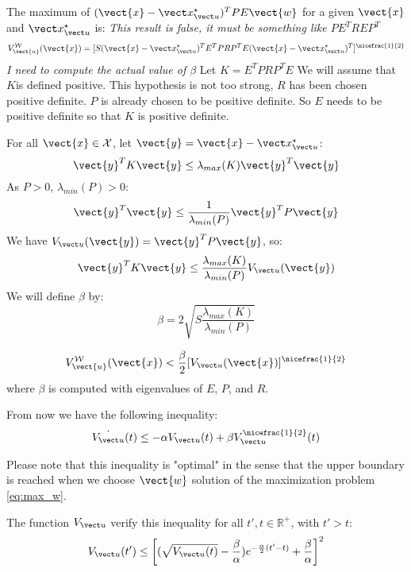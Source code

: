 The maximum of $(\vect{x} - \xu)^T P E \vect{w}$ for a given $\vect{x}$ and $\xu$ is:
\newcommand{\Vwu}{V_{\vect{u}}^{\mathcal{W}}}
\textit{This result is false, it must be something like $P E^T R E P^T $}
\begin{equation}
\Vwu(\vect{x}) = [S (\vect{x} -\xu)^T E^T P R P^T E (\vect{x} -\xu)^T ]^{\nicefrac{1}{2}}
\end{equation}
\textit{I need to compute the actual value of $\beta$}
Let $K = E^T P R P^T E$
We will assume that $K$is defined positive.
This hypothesis is not too strong, $R$ has been chosen positive definite.
$P$ is already chosen to be positive definite.
So $E$ needs to be positive definite so that $K$ is positive definite.

For all $\vect{x} \in \mathcal{X}$, let $\vect{y} = \vect{x} -\xu$:
$$\vect{y}^T K \vect{y} \leq  \lambda_{max}(K) \vect{y}^T \vect{y}$$
As $P>0$, $\lambda_{min}(P)>0$:
$$\vect{y}^T \vect{y} \leq \frac{1}{\lambda_{min}(P)}  \vect{y}^T P \vect{y}$$
We have $\Vu(\vect{y}) = \vect{y}^T P \vect{y}$, so:
$$\vect{y}^T K \vect{y} \leq \frac{\lambda_{max}(K)}{\lambda_{min}(P)}  \Vu(\vect{y})$$
\newcommand{\Bu}{\beta}
We will define $\Bu$ by:
$$\Bu = 2\sqrt{S \frac{\lambda_{max}(K)}{\lambda_{min}(P)} }$$

\begin{equation}
\Vwu(\vect{x}) < \frac{\Bu}{2} [\Vu(\vect{x})]^{\nicefrac{1}{2}}
\end{equation}
where $\Bu$ is computed with eigenvalues of $E$, $P$, and $R$.

From now we have the following inequality:
\begin{equation}
\dot{\Vu}(t) \leq -\alpha \Vu(t) + \Bu \Vu^{\nicefrac{1}{2}}(t)
\end{equation}

Please note that this inequality is "optimal" in the sense that the upper boundary is reached when  we choose $\vect{w}$ solution of the maximization problem \ref{eq:max_w}.

\begin{prop} \label{ineq:lyap}
The function $\Vu$ verify this inequality for all $t',t \in \mathbb{R}^+$, with $t'>t$:
\begin{equation}
\Vu(t') \leq  \left[ (\sqrt{\Vu(t)} - \frac{\Bu}{\alpha}) e^{-\frac{\alpha}{2} (t'-t)} + \frac{\Bu}{\alpha} \right] ^2
\end{equation} 
\end{prop}

